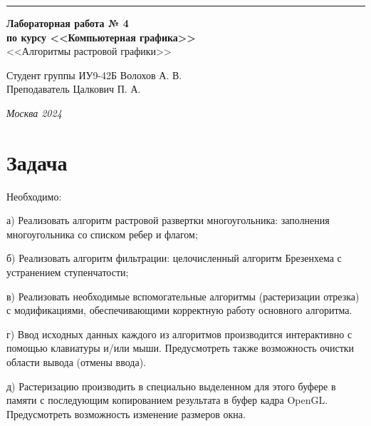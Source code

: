 \documentclass[a4paper, 14pt]{extarticle}
\begin{document}
\begin{titlepage}
\vspace*{-16pt}
\hspace{30pt}\rule{0.866\textwidth}{0.4pt}
  
\vspace{11em}

\begin{center}
\Large {\bf Лабораторная работа № 4} \\
\large {\bf по курсу <<Компьютерная графика>>} \\
\large <<Алгоритмы растровой графики>>
\end{center}\normalsize

\vspace{8em}


\begin{flushright}
  {Студент группы ИУ9-42Б Волохов А. В.\hspace*{15pt} \\
  \vspace{2ex}
  Преподаватель Цалкович П. А.\hspace*{15pt}}
\end{flushright}

\bigskip

\vfill


\begin{center}
\textsl{Москва 2024}
\end{center}
\end{titlepage}

\renewcommand{\ttdefault}{pcr}

\setlength{\tabcolsep}{3pt}
\newpage
\setcounter{page}{2}

\section{Задача}\label{Sect::task}
Необходимо:
\par
а) Реализовать алгоритм растровой развертки многоугольника: заполнения многоугольника со списком ребер и флагом;
\par
б) Реализовать алгоритм фильтрации: целочисленный алгоритм Брезенхема с устранением ступенчатости;
\par
в) Реализовать необходимые вспомогательные алгоритмы (растеризации отрезка) с
модификациями, обеспечивающими корректную работу основного алгоритма.
\par
г) Ввод исходных данных каждого из алгоритмов производится интерактивно с помощью
клавиатуры и/или мыши. Предусмотреть также возможность очистки области вывода (отмены
ввода).
\par
д) Растеризацию производить в специально выделенном для этого буфере в памяти с
последующим копированием результата в буфер кадра OpenGL. Предусмотреть возможность
изменение размеров окна.
\end{document}
